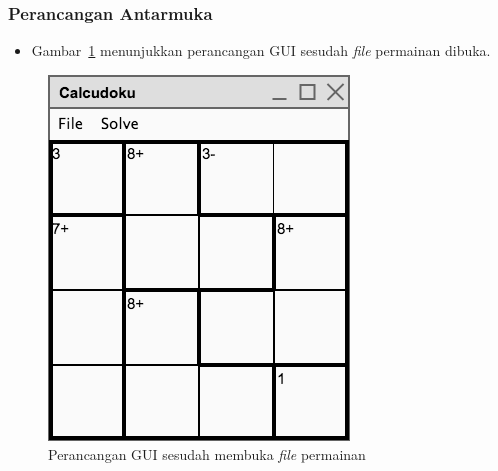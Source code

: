 \documentclass{beamer}
\begin{document}
\begin{frame}
\frametitle{Perancangan Antarmuka}
\begin{itemize}
\item Gambar~\ref{fig:perancangangui2} menunjukkan perancangan GUI sesudah \textit{file} permainan dibuka. 
\end{itemize}
\begin{figure}
\centering
\captionsetup{justification=centering}
\includegraphics[scale=0.4]{Gambar/Perancangan/PerancanganGUI2.png}
\caption[Perancangan GUI sesudah \textit{file} permainan dibuka.]{Perancangan GUI sesudah membuka \textit{file} permainan}
\label{fig:perancangangui2}
\end{figure}
\end{frame}

\end{document}
